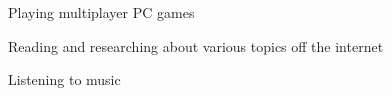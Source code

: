 

\begin{cvskills}

  \cvskill
    {} %
    {
    \begin{cvitems} %
        \item {Playing multiplayer PC games }
        \item {Reading and researching about various topics off the internet}
        \item {Listening to music}
      \end{cvitems}
    } %
    

\end{cvskills}
